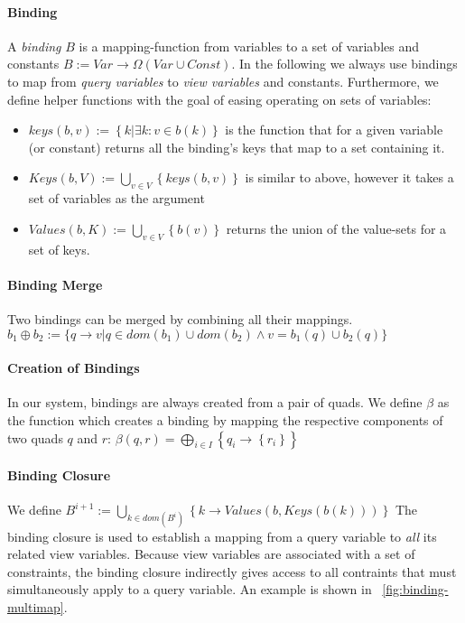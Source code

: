 \documentclass[a4paper,twoside,bibtotoc,abstracton,12pt,BCOR=15mm]{scrreprt}
\begin{document}
\paragraph{Binding}
A \emph{binding} $B$ is a mapping-function from variables to a set of variables and constants $B := Var \rightarrow  \Omega{ \left ( Var \cup Const \right ) }$.
In the following we always use bindings to map from \emph{query variables} to \emph{view variables} and constants.
Furthermore, we define helper functions with the goal of easing operating on sets of variables:
\begin{itemize}
\item $keys(b, v) := \left\{ k | \exists k: v \in b(k) \right\}$ is the function that for a given variable (or constant) returns all the binding's keys that map to a set containing it.
\item $Keys(b, V) := \bigcup_{v \in V} \left \{ keys(b, v) \right \}$ is similar to above, however it takes a set of variables as the argument
\item $Values(b, K) := \bigcup_{v \in V} \left \{ b(v) \right \}$ returns the union of the value-sets for a set of keys.
\end{itemize}


\paragraph{Binding Merge}
Two bindings can be merged by combining all their mappings. $b_1 \oplus b_2 := \{q \rightarrow v | q \in {dom(b_1) \cup dom(b_2)} \wedge v = b_1(q) \cup b_2(q)\}$ 

\paragraph{Creation of Bindings}
In our system, bindings are always created from a pair of quads. We define $\beta$ as the function which creates a binding
by mapping the respective components of two quads $q$ and $r$:
 $\beta(q, r) = \bigoplus_{i \in I} \left \{q_i \rightarrow \left \{r_i \right \} \right \}$

\paragraph{Binding Closure}
We define $B^{i+1} := \bigcup_{k \in dom(B^i)} \left \{ k \rightarrow Values(b, Keys(b(k))) \right \}$
The binding closure is used to establish a mapping from a query variable to \emph{all} its related view variables.
Because view variables are associated with a set of constraints, the binding closure indirectly gives access to all contraints that must simultaneously apply to a query variable.
An example is shown in ~\autoref{fig:binding-multimap}.
\end{document}

